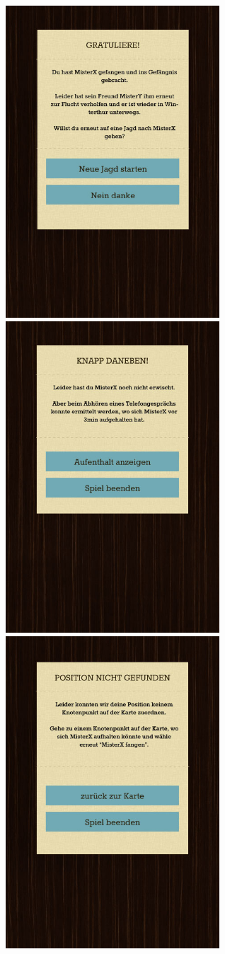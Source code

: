 \documentclass[11pt]{article}
\begin{document}
\includegraphics[width=8cm]{Bilder/gefundenView.jpg}
\includegraphics[width=8cm]{Bilder/danebenView.jpg}
\includegraphics[width=8cm]{Bilder/keinePositionView.jpg}
\end{document}
